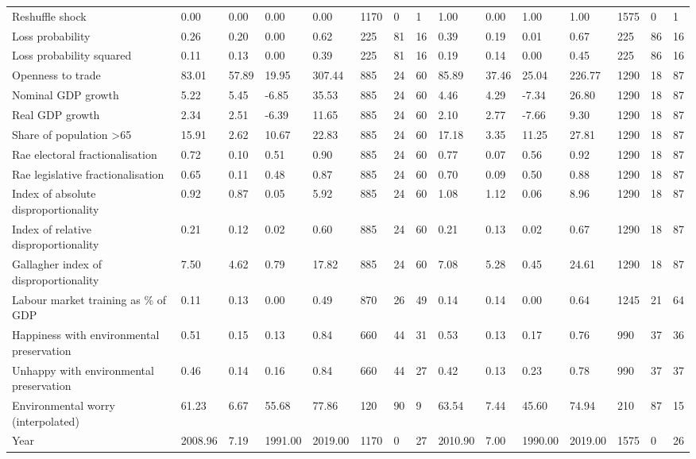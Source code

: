 \begin{longtable}{lllllllllllllll}
\addlinespace
Reshuffle shock & 0.00 & 0.00 & 0.00 & 0.00 & 1170 & 0 & 1 & 1.00 & 0.00 & 1.00 & 1.00 & 1575 & 0 & 1\\
Loss probability & 0.26 & 0.20 & 0.00 & 0.62 & 225 & 81 & 16 & 0.39 & 0.19 & 0.01 & 0.67 & 225 & 86 & 16\\
Loss probability squared & 0.11 & 0.13 & 0.00 & 0.39 & 225 & 81 & 16 & 0.19 & 0.14 & 0.00 & 0.45 & 225 & 86 & 16\\
Openness to trade & 83.01 & 57.89 & 19.95 & 307.44 & 885 & 24 & 60 & 85.89 & 37.46 & 25.04 & 226.77 & 1290 & 18 & 87\\
Nominal GDP growth & 5.22 & 5.45 & -6.85 & 35.53 & 885 & 24 & 60 & 4.46 & 4.29 & -7.34 & 26.80 & 1290 & 18 & 87\\
\addlinespace
Real GDP growth & 2.34 & 2.51 & -6.39 & 11.65 & 885 & 24 & 60 & 2.10 & 2.77 & -7.66 & 9.30 & 1290 & 18 & 87\\
Share of population >65 & 15.91 & 2.62 & 10.67 & 22.83 & 885 & 24 & 60 & 17.18 & 3.35 & 11.25 & 27.81 & 1290 & 18 & 87\\
Rae electoral fractionalisation & 0.72 & 0.10 & 0.51 & 0.90 & 885 & 24 & 60 & 0.77 & 0.07 & 0.56 & 0.92 & 1290 & 18 & 87\\
Rae legislative fractionalisation & 0.65 & 0.11 & 0.48 & 0.87 & 885 & 24 & 60 & 0.70 & 0.09 & 0.50 & 0.88 & 1290 & 18 & 87\\
Index of absolute disproportionality & 0.92 & 0.87 & 0.05 & 5.92 & 885 & 24 & 60 & 1.08 & 1.12 & 0.06 & 8.96 & 1290 & 18 & 87\\
\addlinespace
Index of relative disproportionality & 0.21 & 0.12 & 0.02 & 0.60 & 885 & 24 & 60 & 0.21 & 0.13 & 0.02 & 0.67 & 1290 & 18 & 87\\
Gallagher index of disproportionality & 7.50 & 4.62 & 0.79 & 17.82 & 885 & 24 & 60 & 7.08 & 5.28 & 0.45 & 24.61 & 1290 & 18 & 87\\
Labour market training as \% of GDP & 0.11 & 0.13 & 0.00 & 0.49 & 870 & 26 & 49 & 0.14 & 0.14 & 0.00 & 0.64 & 1245 & 21 & 64\\
Happiness with environmental preservation & 0.51 & 0.15 & 0.13 & 0.84 & 660 & 44 & 31 & 0.53 & 0.13 & 0.17 & 0.76 & 990 & 37 & 36\\
Unhappy with environmental preservation & 0.46 & 0.14 & 0.16 & 0.84 & 660 & 44 & 27 & 0.42 & 0.13 & 0.23 & 0.78 & 990 & 37 & 37\\
\addlinespace
Environmental worry (interpolated) & 61.23 & 6.67 & 55.68 & 77.86 & 120 & 90 & 9 & 63.54 & 7.44 & 45.60 & 74.94 & 210 & 87 & 15\\
Year & 2008.96 & 7.19 & 1991.00 & 2019.00 & 1170 & 0 & 27 & 2010.90 & 7.00 & 1990.00 & 2019.00 & 1575 & 0 & 26\\
\bottomrule
\end{longtable}
